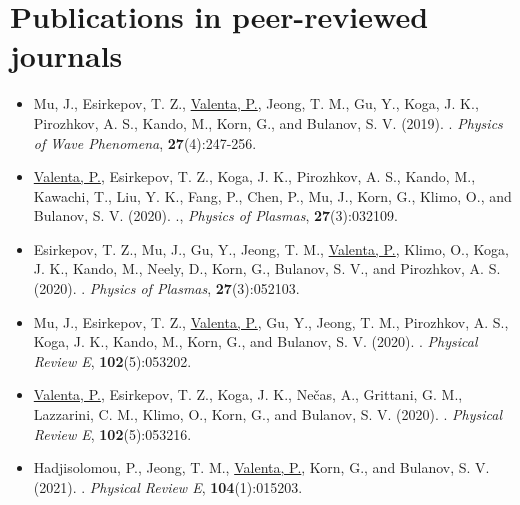 \documentclass[10pt, twoside, a4paper, openright]{report}
\newcommand{\link}[3][blue]{\href{#2}{\color{#1}{#3}}}%
\begin{document}
\section{Publications in peer-reviewed journals \label{sec:peer_reviewed_journals}}

\begin{itemize}
	
	\item Mu, J., Esirkepov, T. Z., \underline{Valenta, P.}, Jeong, T. M., Gu, Y., Koga, J. K., Pirozhkov, A. S., Kando, M., Korn, G., and Bulanov, S. V. (2019). \link{http://dx.doi.org/10.3103/S1541308X19040010}{High-order harmonics from laser irradiated electron density singularity formed at the bow wave in the laser plasma}. \textit{Physics of Wave Phenomena}, \textbf{27}(4):247-256.
	
	\item \underline{Valenta, P.}, Esirkepov, T. Z., Koga, J. K., Pirozhkov, A. S., Kando, M., Kawachi, T., Liu, Y. K., Fang, P., Chen, P., Mu, J., Korn, G., Klimo, O., and Bulanov, S. V. (2020). \link{http://dx.doi.org/10.1063/1.5142084}{Recoil effects on reflection from relativistic mirrors in laser plasmas}., \textit{Physics of Plasmas}, \textbf{27}(3):032109.
	
	\item Esirkepov, T. Z., Mu, J., Gu, Y., Jeong, T. M., \underline{Valenta, P.}, Klimo, O., Koga, J. K., Kando, M., Neely, D., Korn, G., Bulanov, S. V., and Pirozhkov, A. S. (2020). \link{http://dx.doi.org/10.1063/5.0004525}{Optical probing of relativistic plasma singularities}. \textit{Physics of Plasmas}, \textbf{27}(3):052103.
	
	\item Mu, J., Esirkepov, T. Z., \underline{Valenta, P.}, Gu, Y., Jeong, T. M., Pirozhkov, A. S., Koga, J. K., Kando, M., Korn, G., and Bulanov, S. V. (2020). \link{http://dx.doi.org/10.1103/PhysRevE.102.053202}{Relativistic flying forcibly oscillating reflective diffraction grating}. \textit{Physical Review E}, \textbf{102}(5):053202.
	
	\item \underline{Valenta, P.}, Esirkepov, T. Z., Koga, J. K., Nečas, A., Grittani, G. M., Lazzarini, C. M., Klimo, O., Korn, G., and Bulanov, S. V. (2020). \link{http://dx.doi.org/10.1103/PhysRevE.102.053216}{Polarity reversal of wakefields driven by ultrashort pulse laser}. \textit{Physical Review E}, \textbf{102}(5):053216.
	
	\item Hadjisolomou, P., Jeong, T. M., \underline{Valenta, P.}, Korn, G., and Bulanov, S. V. (2021). \link{http://dx.doi.org/10.1103/PhysRevE.104.015203}{Gamma-ray flash generation in irradiating a thin foil target by a single-cycle tightly focused extreme power laser pulse}. \textit{Physical Review E}, \textbf{104}(1):015203.
	
\end{itemize}
\end{document}

